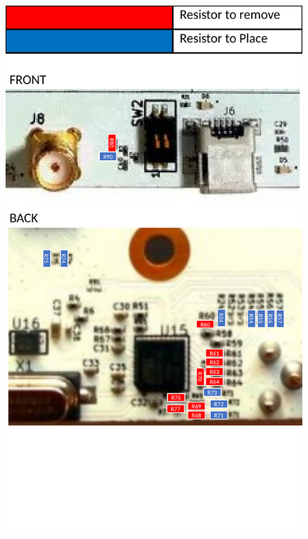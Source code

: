 \documentclass{article}
\begin{document}
	\begin{figure}[ht]
		\begin{center}
		\includegraphics[scale=0.6]{zipper_layout2}
		\end{center}
	\end{figure}
	\label{fig:zipper_layout2}
	\pagebreak
\end{document}
